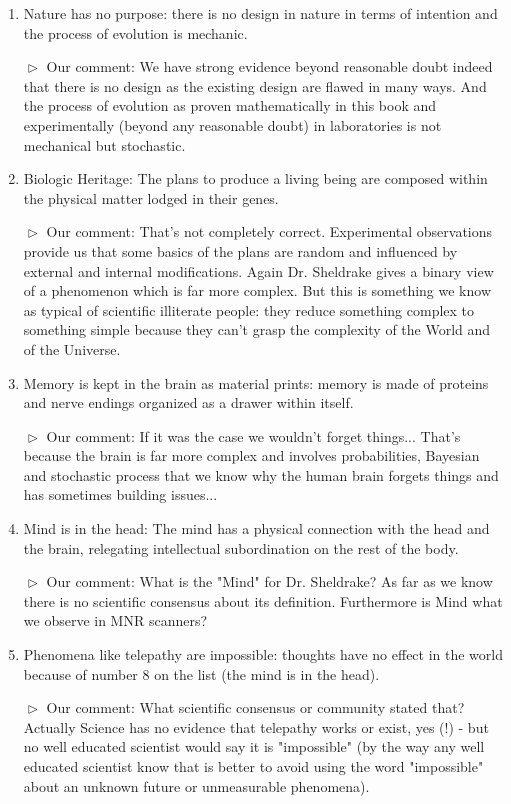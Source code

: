 \begin{enumerate}
		\item \og Nature has no purpose: there is no design in nature in terms of intention and the process of evolution is mechanic. \fg{}
		
		$\vartriangleright$ Our comment: We have strong evidence beyond reasonable doubt indeed that there is no design as the existing design are flawed in many ways. And the process of evolution as proven mathematically in this book and experimentally (beyond any reasonable doubt) in laboratories is not mechanical but stochastic.

		\item \og Biologic Heritage: The plans to produce a living being are composed within the physical matter lodged in their genes. \fg{}
		
		$\vartriangleright$ Our comment: That's not completely correct. Experimental observations provide us that some basics of the plans are random and influenced by external and internal modifications. Again Dr. Sheldrake gives a binary view of a phenomenon which is far more complex. But this is something we know as typical of scientific illiterate people: they reduce something complex to something simple because they can't grasp the complexity of the World and of the Universe.

		\item \og Memory is kept in the brain as material prints: memory is made of proteins and nerve endings organized as a drawer within itself. \fg{}
		
		$\vartriangleright$ Our comment: If it was the case we wouldn't forget things... That's because the brain is far more complex and involves probabilities, Bayesian and stochastic process that we know why the human brain forgets things and has sometimes building issues...

		\item \og Mind is in the head: The mind has a physical connection with the head and the brain, relegating intellectual subordination on the rest of the body. \fg{}
		
		$\vartriangleright$ Our comment: What is the "Mind" for Dr. Sheldrake? As far as we know there is no scientific consensus about its definition. Furthermore is Mind what we observe in MNR scanners?

		\item \og Phenomena like telepathy are impossible: thoughts have no effect in the world because of number 8 on the list (the mind is in the head). \fg{}
		
		$\vartriangleright$ Our comment: What scientific consensus or community stated that? Actually Science has no evidence that telepathy works or exist, yes (!) - but no well educated scientist would say it is "impossible" (by the way any well educated scientist know that is better to avoid using the word "impossible" about an unknown future or unmeasurable phenomena).


\end{enumerate}
